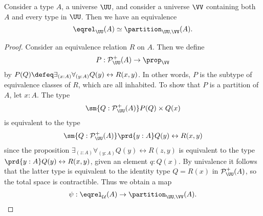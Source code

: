 \begin{thm}
  Consider a type $A$, a universe $\UU$, and consider a universe $\VV$ containing both $A$ and every type in $\UU$. Then we have an equivalence
  \begin{equation*}
    \eqrel_{\UU}(A)\simeq\partition_{\UU,\VV}(A).
  \end{equation*}
\end{thm}

\begin{proof}
  Consider an equivalence relation $R$ on $A$. Then we define
  \begin{equation*}
    P:\mathcal{P}_{\UU}^+(A)\to\prop_\VV
  \end{equation*}
  by $P(Q)\defeq\exists_{(x:A)}\forall_{(y:A)}Q(y)\leftrightarrow R(x,y)$. In other words, $P$ is the subtype of equivalence classes of $R$, which are all inhabited. To show that $P$ is a partition of $A$, let $x:A$. The type
  \begin{equation*}
    \sm{Q:\mathcal{P}_{\UU}^+(A)}P(Q)\times Q(x)
  \end{equation*}
  is equivalent to the type
  \begin{equation*}
    \sm{Q:\mathcal{P}_{\UU}^+(A)}\prd{y:A}Q(y)\leftrightarrow R(x,y)
  \end{equation*}
  since the proposition $\exists_{(z:A)}\forall_{(y:A)}Q(y)\leftrightarrow R(z,y)$ is equivalent to the type $\prd{y:A}Q(y)\leftrightarrow R(x,y)$, given an element $q:Q(x)$. By univalence it follows that the latter type is equivalent to the identity type $Q=R(x)$ in $\mathcal{P}_{\UU}^+(A)$, so the total space is contractible. Thus we obtain a map
  \begin{equation*}
    \psi:\eqrel_{\mathcal{U}}(A)\to\partition_{\UU,\VV}(A).
  \end{equation*}
  

\end{proof}
